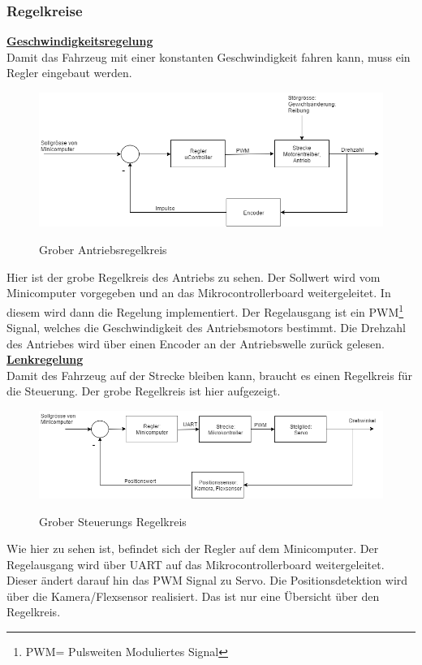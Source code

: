 \subsubsection{Regelkreise}
\underline{\textbf{Geschwindigkeitsregelung}}\\[0.2cm]
Damit das Fahrzeug mit einer konstanten Geschwindigkeit fahren kann, muss ein Regler eingebaut werden.
\begin{figure}[H]
	\centering
	\includegraphics[width=1\textwidth]{03_Loesungskonzept/pictures/Gesch_Regelung.png}
	\label{Regelung_Gesch}
	\caption{Grober Antriebsregelkreis}
\end{figure}\flushleft
Hier ist der grobe Regelkreis des Antriebs zu sehen. Der Sollwert wird vom Minicomputer vorgegeben und an das Mikrocontrollerboard weitergeleitet. In diesem wird dann die Regelung implementiert. Der Regelausgang ist ein PWM\footnote{PWM= Pulsweiten Moduliertes Signal} Signal, welches die Geschwindigkeit des Antriebsmotors bestimmt. Die Drehzahl des Antriebes wird über einen Encoder an der Antriebswelle zurück gelesen.\\[0.2cm]
\underline{\textbf{Lenkregelung}}\\[0.2cm]
Damit des Fahrzeug auf der Strecke bleiben kann, braucht es einen Regelkreis für die Steuerung. Der grobe Regelkreis ist hier aufgezeigt.
\begin{figure}[H]
	\centering
	\includegraphics[width=1\textwidth]{03_Loesungskonzept/pictures/Lenk_Regelung.png}
	\label{Regelung_Lenken}
	\caption{Grober Steuerungs Regelkreis }
\end{figure}\flushleft
Wie hier zu sehen ist, befindet sich der Regler auf dem Minicomputer. Der Regelausgang wird über UART auf das Mikrocontrollerboard weitergeleitet. Dieser ändert darauf hin das PWM Signal zu Servo. Die Positionsdetektion wird über die Kamera/Flexsensor realisiert. Das ist nur eine Übersicht über den Regelkreis.
